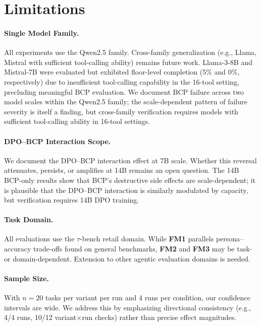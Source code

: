 \documentclass[11pt]{article}
\newcommand{\taubench}{$\tau$-bench}
\newcommand{\fm}[1]{\textbf{FM#1}}
\begin{document}
\section{Limitations}

\paragraph{Single Model Family.}
All experiments use the Qwen2.5 family. Cross-family generalization (e.g., Llama, Mistral with sufficient tool-calling ability) remains future work. Llama-3-8B and Mistral-7B were evaluated but exhibited floor-level completion (5\% and 0\%, respectively) due to insufficient tool-calling capability in the 16-tool setting, precluding meaningful BCP evaluation. We document BCP failure across two model scales within the Qwen2.5 family; the scale-dependent pattern of failure severity is itself a finding, but cross-family verification requires models with sufficient tool-calling ability in 16-tool settings.

\paragraph{DPO--BCP Interaction Scope.}
We document the DPO--BCP interaction effect at 7B scale. Whether this reversal attenuates, persists, or amplifies at 14B remains an open question. The 14B BCP-only results show that BCP's destructive side effects are scale-dependent; it is plausible that the DPO--BCP interaction is similarly modulated by capacity, but verification requires 14B DPO training.

\paragraph{Task Domain.}
All evaluations use the \taubench{} retail domain. While \fm{1} parallels persona--accuracy trade-offs found on general benchmarks, \fm{2} and \fm{3} may be task- or domain-dependent. Extension to other agentic evaluation domains is needed.

\paragraph{Sample Size.}
With $n=20$ tasks per variant per run and 4 runs per condition, our confidence intervals are wide. We address this by emphasizing directional consistency (e.g., 4/4 runs, 10/12 variant$\times$run checks) rather than precise effect magnitudes.
\end{document}
